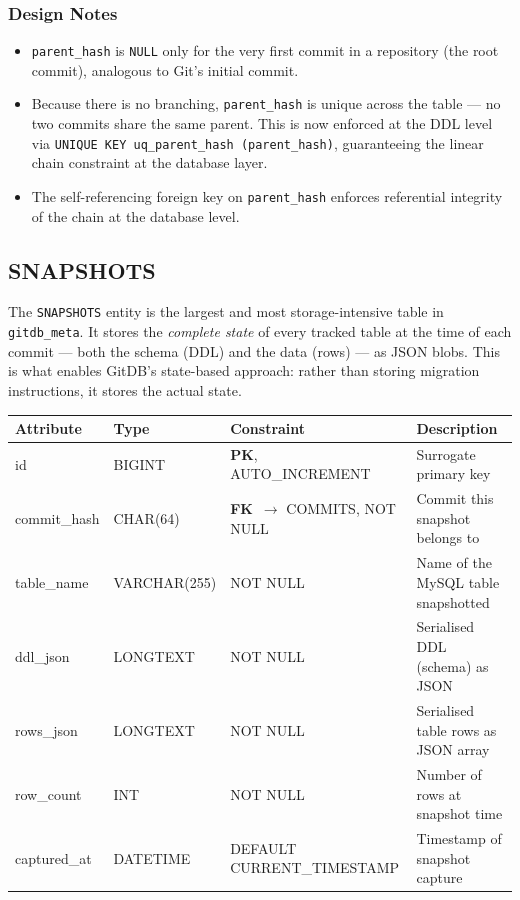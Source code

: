 \documentclass[12pt, a4paper]{article}
\newcommand{\pk}{\textbf{\textcolor{sectioncolor}{PK}}}
\newcommand{\fk}{\textbf{\textcolor{red!70!black}{FK}}}
\begin{document}
\subsubsection*{Design Notes}
\begin{itemize}[leftmargin=1.5em]
    \item \texttt{parent\_hash} is \texttt{NULL} only for the very first commit
    in a repository (the root commit), analogous to Git's initial commit.
    \item Because there is no branching, \texttt{parent\_hash} is unique across
    the table --- no two commits share the same parent. This is now enforced
    at the DDL level via \texttt{UNIQUE KEY uq\_parent\_hash (parent\_hash)},
    guaranteeing the linear chain constraint at the database layer.
    \item The self-referencing foreign key on \texttt{parent\_hash} enforces
    referential integrity of the chain at the database level.
\end{itemize}

\subsection{SNAPSHOTS}

The \texttt{SNAPSHOTS} entity is the largest and most storage-intensive table in
\texttt{gitdb\_meta}. It stores the \textit{complete state} of every tracked
table at the time of each commit --- both the schema (DDL) and the data (rows)
--- as JSON blobs. This is what enables GitDB's state-based approach: rather than
storing migration instructions, it stores the actual state.

\begin{center}
\begin{tabular}{>{\ttfamily}l >{\ttfamily}l l l}
\toprule
\textbf{Attribute} & \textbf{Type} & \textbf{Constraint} & \textbf{Description} \\
\midrule
id           & BIGINT       & \pk, AUTO\_INCREMENT          & Surrogate primary key \\
commit\_hash & CHAR(64)     & \fk\ $\to$ COMMITS, NOT NULL  & Commit this snapshot belongs to \\
table\_name  & VARCHAR(255) & NOT NULL                      & Name of the MySQL table snapshotted \\
ddl\_json    & LONGTEXT     & NOT NULL                      & Serialised DDL (schema) as JSON \\
rows\_json   & LONGTEXT     & NOT NULL                      & Serialised table rows as JSON array \\
row\_count   & INT          & NOT NULL                      & Number of rows at snapshot time \\
captured\_at & DATETIME     & DEFAULT CURRENT\_TIMESTAMP   & Timestamp of snapshot capture \\
\bottomrule
\end{tabular}
\end{center}
\end{document}
